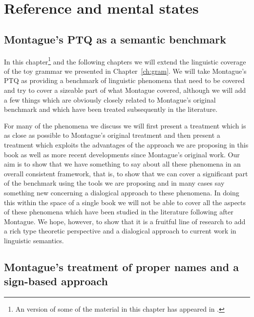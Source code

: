 \chapter{Reference and mental states}
\label{ch:propnames}
\setcounter{equation}{0}

\section{Montague's PTQ as a semantic benchmark}

In this chapter\footnote{An version of some of the material in this
  chapter has appeared in \cite{Cooper2017a}.} and the following chapters we will extend the linguistic coverage of the toy
grammar we presented in Chapter~\ref{ch:gram}.  We will take
Montague's PTQ \citep{Montague1973,Montague1974} as providing a benchmark of linguistic phenomena that
need to be covered and try to cover a sizeable part of what Montague covered, although we will add a few things which are
obviously closely related to Montague's original benchmark and which
have been treated subsequently in the literature.

For many of the phenomena we discuss we will first present a treatment
which is as close as possible to Montague's original treatment and
then present a treatment which exploits the advantages of the approach
we are proposing in this book as well as more recent developments
since Montague's original work.  Our aim is to show that we have
something to say about all these phenomena in an overall consistent
framework, that is, to show that we can cover a significant part of the benchmark using the
tools we are proposing and in many cases say something new concerning
a dialogical approach to these phenomena.  In doing this within the
space of a single book we will not be able to cover all the aspects of
these phenomena which have been studied in the literature following
after Montague.  We hope, however, to show that it is a fruitful line
of research to add a rich type theoretic perspective and a dialogical
approach to current work in linguistic semantics.   
 



\section{Montague's treatment of proper names and a sign-based approach}

